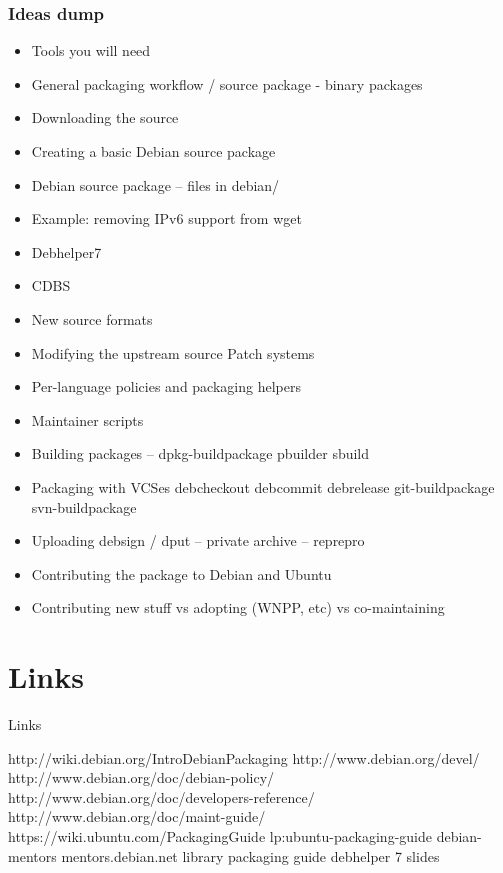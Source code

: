 \documentclass[10pt,final]{beamer}
\begin{document}
\begin{frame}
	\frametitle{Ideas dump}
\begin{itemize}
\item Tools you will need
\item General packaging workflow / source package - binary packages

\item Downloading the source
\item Creating a basic Debian source package
\item Debian source package -- files in debian/
\item Example: removing IPv6 support from wget
\item Debhelper7
\item CDBS
\item New source formats
\item Modifying the upstream source Patch systems
\item Per-language policies and packaging helpers
\item Maintainer scripts
\item Building packages -- dpkg-buildpackage pbuilder sbuild
\item Packaging with VCSes debcheckout debcommit debrelease git-buildpackage svn-buildpackage
\item Uploading debsign / dput -- private archive -- reprepro
\item Contributing the package to Debian and Ubuntu

\item Contributing new stuff vs adopting (WNPP, etc) vs co-maintaining
\end{itemize}
\end{frame}

\section{Links}
\begin{frame}{Links}

http://wiki.debian.org/IntroDebianPackaging
http://www.debian.org/devel/
http://www.debian.org/doc/debian-policy/
http://www.debian.org/doc/developers-reference/
http://www.debian.org/doc/maint-guide/
https://wiki.ubuntu.com/PackagingGuide
lp:ubuntu-packaging-guide
debian-mentors
mentors.debian.net
library packaging guide
debhelper 7 slides
\end{frame}
\end{document}
